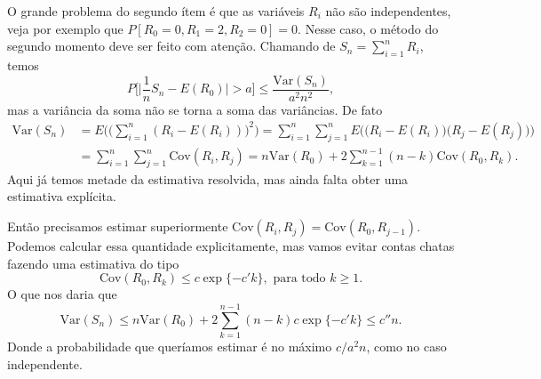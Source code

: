 \documentclass[reqno, draft]{book}
\newcommand*\1{\mathds{1}}
\begin{document}
O grande problema do segundo ítem é que as variáveis $R_i$ não são independentes, veja por exemplo que $P[R_0=0,R_1=2,R_2=0] = 0$.
Nesse caso, o método do segundo momento deve ser feito com atenção.
Chamando de $S_n = \sum_{i=1}^n R_i$, temos
\begin{equation}
  P \Big[ \Big| \frac{1}{n} S_n - E(R_0) \Big| > a \Big] \leq \frac{\text{Var}(S_n)}{a^2 n^2},
\end{equation}
mas a variância da soma não se torna a soma das variâncias.
De fato
\begin{equation}
  \begin{split}
    \text{Var}(S_n) & = E \Big( \big(\sum_{i=1}^n (R_i - E(R_i)) \big)^2\Big) = \sum_{i=1}^n \sum_{j=1}^n E \Big(\big(R_i - E(R_i)\big) \big(R_j - E(R_j) \big)\Big)\\
    & = \sum_{i=1}^n \sum_{j=1}^n \text{Cov}(R_i, R_j) = n \text{Var}(R_0) + 2 \sum_{k=1}^{n-1} (n-k) \text{Cov}(R_0, R_k).
  \end{split}
\end{equation}
Aqui já temos metade da estimativa resolvida, mas ainda falta obter uma estimativa explícita.

Então precisamos estimar superiormente $\text{Cov}(R_i, R_j) = \text{Cov}(R_0, R_{j-1})$.
Podemos calcular essa quantidade explicitamente, mas vamos evitar contas chatas fazendo uma estimativa do tipo
\begin{equation}
  \text{Cov}(R_0, R_k) \leq c \exp\{-c' k\}, \text{ para todo $k \geq 1$}.
\end{equation}
O que nos daria que
\begin{equation}
  \text{Var}(S_n) \leq n \text{Var}(R_0) + 2 \sum_{k=1}^{n-1} (n-k) c \exp\{-c' k\} \leq c'' n.
\end{equation}
Donde a probabilidade que queríamos estimar é no máximo ${c}/{a^2 n}$, como no caso independente.
\end{document}
